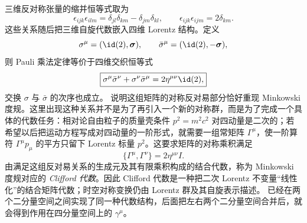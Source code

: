 三维反对称张量的缩并恒等式取为
\begin{equation}
 \boxed{
 \epsilon_{ijk}\epsilon_{ilm}
 =\delta_{jl}\delta_{km}-\delta_{jm}\delta_{kl},
 \qquad
 \epsilon_{ijk}\epsilon_{ijm}=2\delta_{km}.}
 \label{eq:epsilon-contractions-r10}
\end{equation}
这些关系随后把三维自旋代数嵌入四维 Lorentz 结构。定义
\begin{equation}
 \sigma^\mu=(\id(2),\boldsymbol\sigma),
 \qquad
 \bar\sigma^\mu=(\id(2),-\boldsymbol\sigma),
 \label{eq:sigma-barsigma-foundation-r10}
\end{equation}
则 Pauli 乘法定律等价于四维交织恒等式
\begin{equation}
 \boxed{
 \sigma^\mu\bar\sigma^\nu+\sigma^\nu\bar\sigma^\mu
 =2\eta^{\mu\nu}\id(2),}
 \label{eq:sigmabar-proof-r10}
\end{equation}
交换 $\sigma$ 与 $\bar\sigma$ 的次序也成立。 说明这组矩阵的对称反对易部分恰好重现 Minkowski 度规。这里出现这种关系并不是为了再引入一个新的对称群，而是为了完成一个具体的代数任务：相对论自由粒子的质量壳条件 $p^2=m^2c^2$ 对四动量是二次的；若希望以后把运动方程写成对四动量的一阶形式，就需要一组常矩阵 $\Gamma^\mu$，使一阶算符 $\Gamma^\mu p_\mu$ 的平方只留下 Lorentz 标量 $p^2$。这要求矩阵的对称乘积满足
\begin{equation*}
 \{\Gamma^\mu,\Gamma^\nu\}=2\eta^{\mu\nu}I.
\end{equation*}
由满足这组反对易关系的生成元及其有限乘积构成的结合代数，称为 Minkowski 度规对应的 \emph{Clifford 代数}。因此 Clifford 代数是一种把二次 Lorentz 不变量“线性化”的结合矩阵代数；时空对称变换仍由 Lorentz 群及其自旋表示描述。 已经在两个二分量空间之间实现了同一种代数结构，后面把左右两个二分量空间合并后，就会得到作用在四分量空间上的 $\gamma^\mu$。
